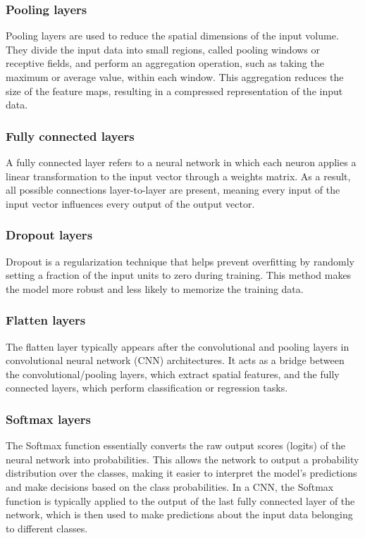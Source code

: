 \documentclass[../paper.tex]{subfiles}
\begin{document}
    \subsubsection{Pooling layers}
    Pooling layers are used to reduce the spatial dimensions of the input volume.
    They divide the input data into small regions, called pooling windows or receptive fields, 
    and perform an aggregation operation, such as taking the maximum or average value, within each window. 
    This aggregation reduces the size of the feature maps, resulting in a compressed representation of the input data.\cite{o7}
    \subsubsection{Fully connected layers}
    A fully connected layer refers to a neural network in which each neuron applies a linear transformation to the input vector through a weights matrix. 
    As a result, all possible connections layer-to-layer are present, meaning every input of the input vector influences every output of the output vector.\cite{o8}
    \subsubsection{Dropout layers}
    Dropout is a regularization technique that helps prevent overfitting by randomly setting a fraction of the input units to zero during training.
    This method makes the model more robust and less likely to memorize the training data.
    \subsubsection{Flatten layers}
    The flatten layer typically appears after the convolutional and pooling layers in convolutional neural network (CNN) architectures. 
    It acts as a bridge between the convolutional/pooling layers, which extract spatial features, 
    and the fully connected layers, which perform classification or regression tasks.\cite{o10}
    \subsubsection{Softmax layers}
    The Softmax function essentially converts the raw output scores (logits) of the neural network into probabilities. 
    This allows the network to output a probability distribution over the classes, 
    making it easier to interpret the model's predictions and make decisions based on the class probabilities.
    In a CNN, the Softmax function is typically applied to the output of the last fully connected layer of the network, 
    which is then used to make predictions about the input data belonging to different classes.\cite{o11}
\end{document}
